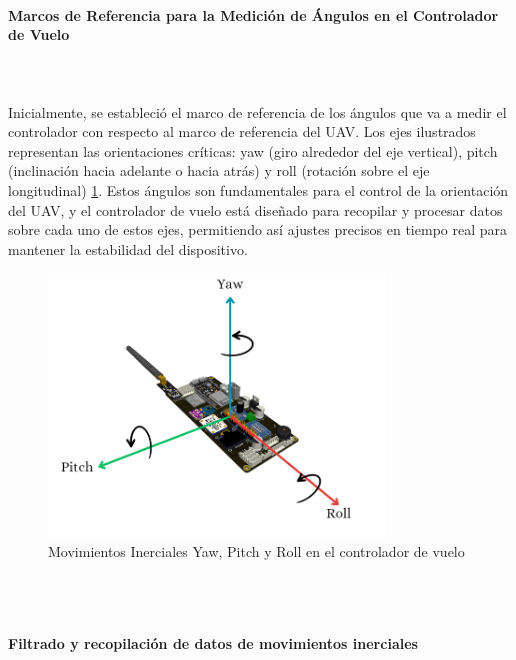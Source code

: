 \paragraph{\large \textbf{ Marcos de Referencia para la Medición de Ángulos en el Controlador de Vuelo}} \\ \\

Inicialmente, se estableció el marco de referencia de los ángulos que va a medir el controlador con respecto al marco de referencia del UAV. Los ejes ilustrados representan las orientaciones críticas: yaw (giro alrededor del eje vertical), pitch (inclinación hacia adelante o hacia atrás) y roll (rotación sobre el eje longitudinal) \ref{fig:movimientos_inerciales}. Estos ángulos son fundamentales para el control de la orientación del UAV, y el controlador de vuelo está diseñado para recopilar y procesar datos sobre cada uno de estos ejes, permitiendo así ajustes precisos en tiempo real para mantener la estabilidad del dispositivo.

\begin{figure}[H]
    \centering
    \includegraphics[width=0.8\textwidth]{Imagenes/Metodologia/pcb_yaw_pitch_roll.png}
    \caption{Movimientos Inerciales Yaw, Pitch y Roll en el controlador de vuelo}
    \label{fig:movimientos_inerciales}
\end{figure}
\\ \\
\paragraph{\large \textbf{Filtrado y recopilación de datos de movimientos inerciales}}
\\ \\

